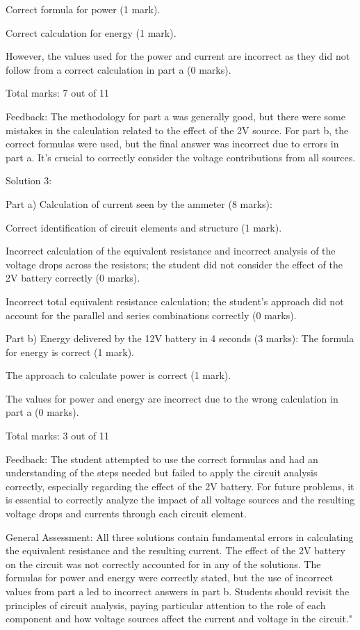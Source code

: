 \documentclass[a4paper,11pt]{article}
\begin{document}
Correct formula for power (1 mark).

Correct calculation for energy (1 mark).

However, the values used for the power and current are incorrect as they did not follow from a correct calculation in part a (0 marks).

Total marks: 7 out of 11

Feedback: The methodology for part a was generally good, but there were some mistakes in the calculation related to the effect of the 2V source. For part b, the correct formulas were used, but the final answer was incorrect due to errors in part a. It's crucial to correctly consider the voltage contributions from all sources.

Solution 3:

Part a) Calculation of current seen by the ammeter (8 marks):

Correct identification of circuit elements and structure (1 mark).

Incorrect calculation of the equivalent resistance and incorrect analysis of the voltage drops across the resistors; the student did not consider the effect of the 2V battery correctly (0 marks).

Incorrect total equivalent resistance calculation; the student's approach did not account for the parallel and series combinations correctly (0 marks).

Part b) Energy delivered by the 12V battery in 4 seconds (3 marks):
The formula for energy is correct (1 mark).

The approach to calculate power is correct (1 mark).

The values for power and energy are incorrect due to the wrong calculation in part a (0 marks).

Total marks: 3 out of 11

Feedback: The student attempted to use the correct formulas and had an understanding of the steps needed but failed to apply the circuit analysis correctly, especially regarding the effect of the 2V battery. For future problems, it is essential to correctly analyze the impact of all voltage sources and the resulting voltage drops and currents through each circuit element.

General Assessment:
All three solutions contain fundamental errors in calculating the equivalent resistance and the resulting current. The effect of the 2V battery on the circuit was not correctly accounted for in any of the solutions. The formulas for power and energy were correctly stated, but the use of incorrect values from part a led to incorrect answers in part b. Students should revisit the principles of circuit analysis, paying particular attention to the role of each component and how voltage sources affect the current and voltage in the circuit."
\end{document}
